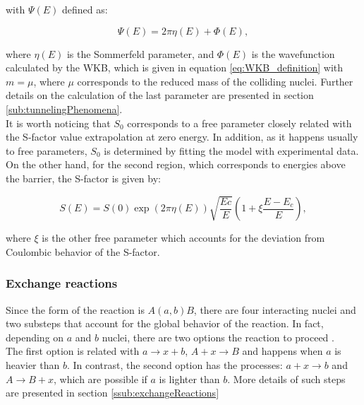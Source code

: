 \documentclass[openany]{book}
\begin{document}
with $\Psi(E)$ defined as: 

\begin{equation}  \label{eq:potential_Yakovlev_psiWKB}
	\Psi(E) = 2\pi\eta(E) + \Phi(E),
\end{equation}

where $\eta(E)$ is the Sommerfeld parameter, and $\Phi(E)$ is the wavefunction calculated by the WKB, which is given in equation \ref{eq:WKB_definition} with $m = \mu$, where $\mu$ corresponds to the reduced mass of the colliding nuclei. Further details on the calculation of the last parameter are presented in section \ref{sub:tunnelingPhenomena}. \\

It is worth noticing that $S_0$ corresponds to a free parameter closely related with the S-factor value extrapolation at zero energy. In addition, as it happens usually to free parameters, $S_0$ is determined by fitting the model with experimental data. \\

On the other hand, for the second region, which corresponds to energies above the barrier, the S-factor is given by:

\begin{equation}  \label{eq:potential_Yakovlev_sfactor_aboveBarrier}
	S(E) = S(0) \exp ({2\pi\eta(E)}) \sqrt{\frac{Ec}{E}} \left( 1 + \xi\frac{E - E_c}{E} \right),
\end{equation}

where $\xi$ is the other free parameter which accounts for the deviation from Coulombic behavior of the S-factor.  \\

\subsubsection{Exchange reactions} \label{ssub:potential_calculations_exchange}

Since the form of the reaction is $A(a, b)B$, there are four interacting nuclei and two substeps that account for the global behavior of the reaction. In fact, depending on  $a$ and $b$ nuclei, there are two options the reaction to proceed \cite{xu_takahashi_goriely_arnould_ohta_utsunomiya_2013}. \\

The first option is related with $ a \rightarrow x + b$,  $A + x \rightarrow B$ and happens when $a$ is heavier than $b$. In contrast, the second option has the processes: $a + x \rightarrow b$ and $A \rightarrow B + x$, which are possible if $a$ is lighter than $b$. More details of such steps are presented in section \ref{ssub:exchangeReactions} \\
\end{document}
